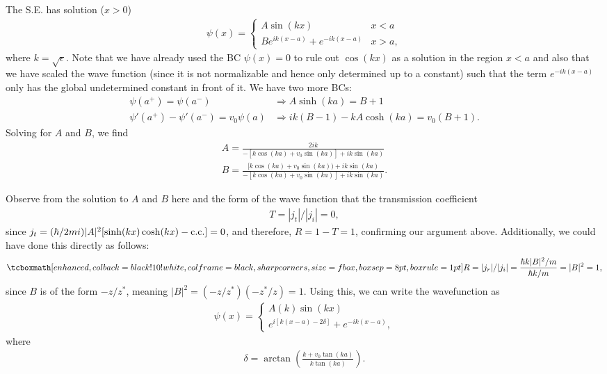 {The S.E. has solution ($x > 0$)
\begin{eqnarray}
    \psi(x) = \begin{cases}
        A \sin(kx) & x < a \\
        B e^{ik(x-a)} + e^{-ik(x-a)} & x > a
    ,\end{cases}
\end{eqnarray}
where $k = \sqrt{\epsilon}$.
Note that we have already used the BC $\psi(x) = 0$ to rule out $\cos(kx)$ as a solution in the region $x < a$ and also that we have scaled the wave function (since it is not normalizable and hence only determined up to a constant) such that the term $e^{-ik(x-a)}$ only has the global undetermined constant in front of it.
We have two more BCs:
\begin{align}
    \psi(a^{+}) = \psi(a^{-}) &\Rightarrow A \sinh(ka) = B + 1 \\
    \psi'(a^{+}) - \psi'(a^{-}) = v_0 \psi(a) &\Rightarrow ik(B - 1) - kA\cosh(ka) = v_0 (B+1)
.\end{align}
Solving for $A$ and $B$, we find
\begin{align}
    A = \frac{2ik}{-[k \cos(ka) + v_0 \sin(ka)] + i k \sin(ka)} \\
    B = \frac{[k \cos(ka) + v_0 \sin(ka)) + i k \sin(ka)}{-[k\cos(ka) + v_0 \sin(ka)] + ik\sin(ka)}
.\end{align}

Observe from the solution to $A$ and $B$ here and the form of the wave function that the transmission coefficient
\begin{eqnarray}
    T = |j_{t}|/|j_{i}| = 0
,\end{eqnarray}
since $j_{t} = (\hbar/2mi)|A|^2 [ \sinh(kx) \cosh(kx) - {\rm c.c.}] = 0$, and therefore, $R = 1 - T = 1$, confirming our argument above.
Additionally, we could have done this directly as follows:
\begin{eqnarray}
    \eqbox{ R = |j_{r}| / |j_{i}| = \frac{\hbar k |B|^2/m}{\hbar k/m} = |B|^2 = 1 }
,\end{eqnarray}
since $B$ is of the form $-z/z^{*}$, meaning $|B|^2 = (-z/z^{*})(-z^{*}/z) = 1$.
Using this, we can write the wavefunction as
\begin{eqnarray}
    \psi(x) = \begin{cases}
        A(k) \sin(kx) \\
        e^{i[k(x-a) - 2\delta]} + e^{-ik(x-a)}
    ,\end{cases}
\end{eqnarray}
where
\begin{eqnarray}
    \delta = \arctan(\frac{k + v_0\tan(ka)}{k\tan(ka)})
.\end{eqnarray}

}
